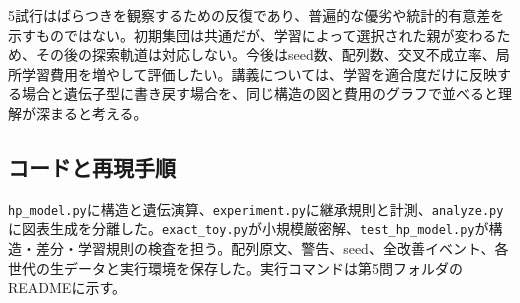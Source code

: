 5試行はばらつきを観察するための反復であり、普遍的な優劣や統計的有意差を示すものではない。初期集団は共通だが、学習によって選択された親が変わるため、その後の探索軌道は対応しない。今後はseed数、配列数、交叉不成立率、局所学習費用を増やして評価したい。講義については、学習を適合度だけに反映する場合と遺伝子型に書き戻す場合を、同じ構造の図と費用のグラフで並べると理解が深まると考える。

\subsection{コードと再現手順}
\texttt{hp\_model.py}に構造と遺伝演算、\texttt{experiment.py}に継承規則と計測、\texttt{analyze.py}に図表生成を分離した。\texttt{exact\_toy.py}が小規模厳密解、\texttt{test\_hp\_model.py}が構造・差分・学習規則の検査を担う。配列原文、警告、seed、全改善イベント、各世代の生データと実行環境を保存した。実行コマンドは第5問フォルダのREADMEに示す。

